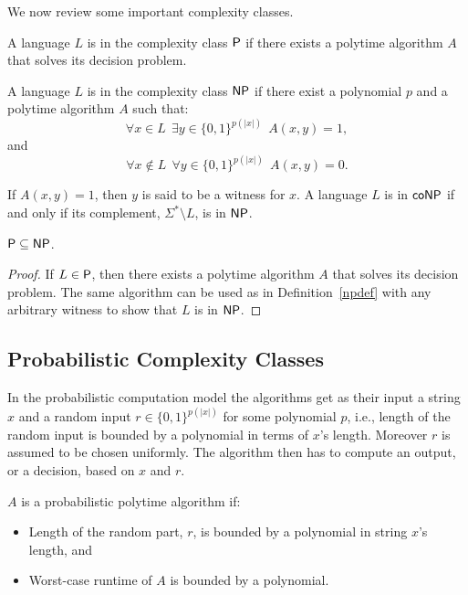 We now review some important complexity classes.
\begin{definition}[$\cc{P}$] \label{pdef} A language $L$ is in the complexity class $\cc{P}$ if there exists a polytime algorithm $A$ that solves its decision problem.
\end{definition}

\begin{definition}\label{npdef} A language $L$ is in the complexity class $\mathsf{NP}$ if there exist a polynomial $p$ and a polytime algorithm $A$ such that:
$$\forall x \in L ~~ \exists y \in \{0, 1\}^{p(\vert x \vert )} ~~ A(x, y) = 1,$$ and 
$$\forall x \not \in L ~~ \forall y \in \{0, 1\}^{p(\vert x \vert )} ~~ A(x, y) = 0.$$

If $A(x, y) = 1$, then $y$ is said to be a witness for $x$. A language $L$ is in $\mathsf{coNP}$ if and only if its complement, $\Sigma^* \setminus L$, is in $\mathsf{NP}$.
\end{definition}

\begin{proposition}
$\mathsf{P} \subseteq \mathsf{NP}$.
\end{proposition}
\begin{proof}
If $L \in \mathsf{P}$, then there exists a polytime algorithm $A$ that solves its decision problem. The same algorithm can be used as in Definition~\ref{npdef} with any arbitrary witness to show that $L$ is in $\mathsf{NP}$.
\end{proof}

\subsection{Probabilistic Complexity Classes}
In the probabilistic computation model the algorithms get as their input a string $x$ and a random input $r \in \{0, 1\}^{p(\vert x \vert)}$ for some polynomial $p$, i.e., length of the random input is bounded by a polynomial in terms of $x$'s length. Moreover $r$ is assumed to be chosen uniformly. The algorithm then has to compute an output, or a decision, based on $x$ and $r$.

\begin{definition}
$A$ is a probabilistic polytime algorithm if:
\begin{itemize}
\item Length of the random part, $r$, is bounded by a polynomial in string $x$'s length, and
\item Worst-case runtime of $A$ is bounded by a polynomial.\qedhere
\end{itemize}
\end{definition}

